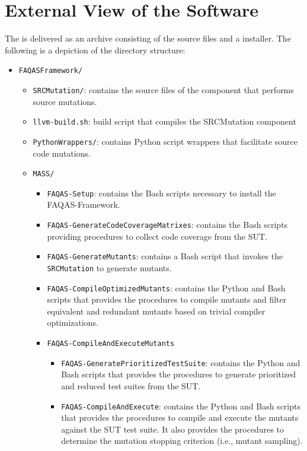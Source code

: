 
\chapter{External View of the Software}

The \FAQAS is delivered as an archive consisting of the source files and a installer.
The following is a depiction of the directory structure:

\begin{itemize}
	\item \texttt{FAQASFramework/}
	\begin{itemize}
		\item \texttt{SRCMutation/}: contains the source files of the component that performs source mutations. 
		\item \texttt{llvm-build.sh}: build script that compiles the SRCMutation component
		\item \texttt{PythonWrappers/}: contains Python script wrappers that facilitate source code mutations.
		\item \texttt{MASS/}
		\begin{itemize} 
			\item \texttt{FAQAS-Setup}: contains the Bash scripts necessary to install the FAQAS-Framework.
			\item \texttt{FAQAS-GenerateCodeCoverageMatrixes}: contains the Bash scripts providing procedures to collect code coverage from the SUT.
			\item \texttt{FAQAS-GenerateMutants}: contains a Bash script that invokes the \texttt{SRCMutation} to generate mutants. 
			\item \texttt{FAQAS-CompileOptimizedMutants}: contains the Python and Bash scripts that provides the procedures to compile mutants and filter equivalent and redundant mutants based on trivial compiler optimizations.
			\item \texttt{FAQAS-CompileAndExecuteMutants}
			\begin{itemize}
				\item \texttt{FAQAS-GeneratePrioritizedTestSuite}: contains the Python and Bash scripts that provides the procedures to generate prioritized and reduced test suites from the SUT.

				\item \texttt{FAQAS-CompileAndExecute}: contains the Python and Bash scripts that provides the procedures to compile and execute the mutants against the SUT test suite. It also provides the procedures to determine the mutation stopping criterion (i.e., mutant sampling).
	

\end{itemize}
\end{itemize}
\end{itemize}
\end{itemize}
